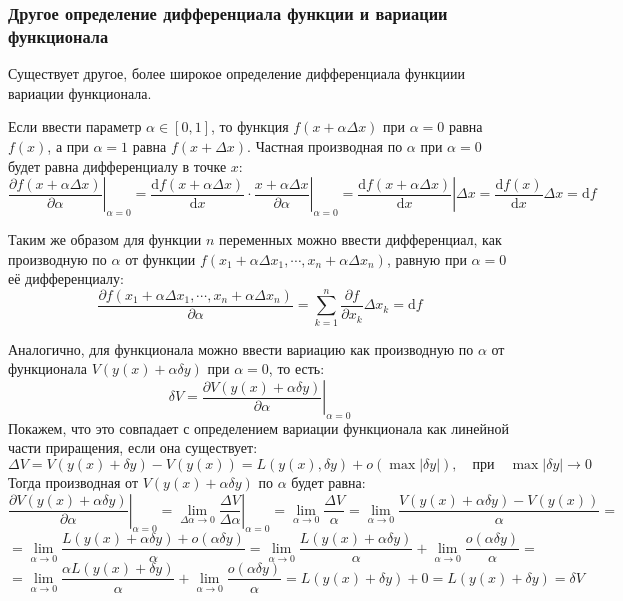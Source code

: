 \documentclass[12pt, a4paper]{article}
\newcommand{\di}{\mathrm{d}}
\begin{document}
\subsubsection{Другое определение дифференциала функции и вариации функционала}

Существует другое, более широкое определение дифференциала функциии вариации функционала.

Если ввести параметр $\alpha \in [0, 1]$, то функция $f(x + \alpha \Delta x)$ при $\alpha = 0$ равна $f(x)$, а при $\alpha = 1$ равна $f(x + \Delta x)$. Частная производная по $\alpha$ при $\alpha = 0$ будет равна дифференциалу в точке $x$:
\[\left. \frac{\partial f(x + \alpha \Delta x)}{\partial \alpha} \right|_{\alpha = 0} = \left. \frac{\di f(x + \alpha \Delta x)}{\di x} \cdot \frac{x + \alpha \Delta x}{\partial \alpha} \right|_{\alpha = 0} = \left. \frac{\di f(x+ \alpha \Delta x)}{\di x} \right| \Delta x = \frac{\di f(x)}{\di x} \Delta x = \di f \]

Таким же образом для функции $n$ переменных можно ввести дифференциал, как производную по $\alpha$ от функции $f(x_1 + \alpha \Delta x_1, \cdots, x_n + \alpha \Delta x_n)$, равную при $\alpha = 0$ её дифференциалу:
\[\frac{\partial f(x_1 + \alpha \Delta x_1, \cdots, x_n + \alpha \Delta x_n)}{\partial \alpha} = \sum_{k=1}^n \frac{\partial f}{\partial x_k} \Delta x_k = \di f \]

Аналогично, для функционала можно ввести вариацию как производную по $\alpha$ от функционала $V(y(x) + \alpha \delta y)$ при $\alpha = 0$, то есть:
\[\delta V = \left. \frac{\partial V(y(x) + \alpha \delta y)}{\partial \alpha} \right|_{\alpha = 0} \]
Покажем, что это совпадает с определением вариации функционала как линейной части приращения, если она существует:
\[\Delta V = V(y(x) + \delta y) - V(y(x)) = L(y(x), \delta y) + o(\max |\delta y|), \quad \textrm{при} \quad \max |\delta y| \to 0 \]
Тогда производная от $V(y(x) + \alpha \delta y)$ по $\alpha$ будет равна:
\[\left. \frac{\partial V(y(x) + \alpha \delta y)}{\partial \alpha} \right|_{\alpha = 0} = \left. \lim_{\Delta \alpha \to 0} \frac{\Delta V}{\Delta \alpha} \right|_{\alpha = 0} = \lim_{\alpha \to 0} \frac{\Delta V}{\alpha} = \lim_{\alpha \to 0} \frac{V(y(x) + \alpha \delta y) - V(y(x))}{\alpha} = \]
\[= \lim_{\alpha \to 0} \frac{L(y(x) + \alpha \delta y) + o(\alpha \delta y)}{\alpha} = \lim_{\alpha \to 0} \frac{L(y(x) + \alpha \delta y)}{\alpha} + \lim_{\alpha \to 0} \frac{o(\alpha \delta y)}{\alpha} = \]
\[= \lim_{\alpha \to 0} \frac{\alpha L(y(x) + \delta y)}{\alpha} + \lim_{\alpha \to 0} \frac{o(\alpha \delta y)}{\alpha} = L(y(x) + \delta y) + 0 = L(y(x) + \delta y) = \delta V \]
\end{document}
